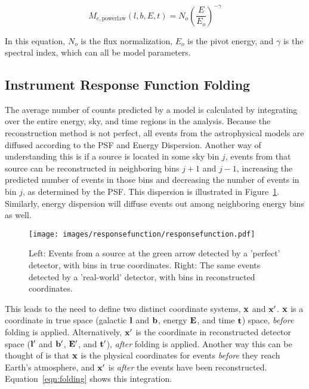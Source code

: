   \begin{equation}\label{eqn:powerlaw_Me}
    M_{e,\textrm{powerlaw}}(l,b,E,t) = N_o \left ( \frac{E}{E_o} \right )^{-\gamma}
  \end{equation}

  In this equation, $N_o$ is the flux normalization, $E_o$ is the pivot energy, and $\gamma$ is the spectral index, which can all be model parameters.

  
  \subsection{Instrument Response Function Folding}\label{subsec:folding}
  The average number of counts predicted by a model is calculated by integrating over the entire energy, sky, and time regions in the analysis.
  Because the reconstruction method is not perfect, all events from the astrophysical models are diffused according to the PSF and Energy Dispersion.
  Another way of understanding this is if a source is located in some sky bin $j$, events from that source can be reconstructed in neighboring bins $j+1$ and $j-1$, increasing the predicted number of events in those bins and decreasing the number of events in bin $j$, as determined by the PSF.
  This dispersion is illustrated in Figure~\ref{fig:responsedispersion}.
  Similarly, energy dispersion will diffuse events out among neighboring energy bins as well.
  
  \begin{figure}[!t]
    \centering
    \texttt{[image: images/responsefunction/responsefunction.pdf]}
    \caption[Response Function Dispersion]
    {
      Left: Events from a source at the green arrow detected by a 'perfect' detector, with bins in true coordinates.
      Right: The same events detected by a 'real-world' detector, with bins in reconstructed coordinates.
    }
    \label{fig:responsedispersion}
  \end{figure}
  
  This leads to the need to define two distinct coordinate systems, $\mathbf{x }$ and $\mathbf{x'}$.
  $\mathbf{x }$ is a coordinate in true space (galactic $\mathbf{l }$ and $\mathbf{b }$, energy $\mathbf{E }$, and time $\mathbf{t }$) space, \textit{before} folding is applied.
  Alternatively, $\mathbf{x'}$ is the coordinate in reconstructed detector space ($\mathbf{l'}$ and $\mathbf{b'}$, $\mathbf{E'}$, and $\mathbf{t'}$), \textit{after} folding is applied.
  Another way this can be thought of is that $\mathbf{x }$ is the physical coordinates for events \textit{before} they reach Earth's atmosphere, and $\mathbf{x'}$ is \textit{after} the events have been reconstructed.
  Equation~\ref{eqn:folding} shows this integration.
  
